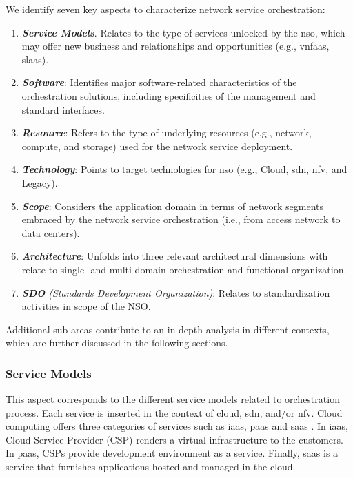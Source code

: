 We identify seven key aspects to characterize network service orchestration: 
\begin{enumerate}
\item \textit{\textbf{Service Models}}. Relates to the type of services unlocked by the \gls{nso}, which may offer new business and relationships and opportunities  (e.g., \gls{vnfaas}, \gls{slaas}).
\item \textbf{\textit{Software}}: Identifies major software-related characteristics of the orchestration solutions, including specificities of the  management and standard interfaces.
\item \textbf{\textit{Resource}}: Refers to the type of underlying resources (e.g., network, compute, and storage) used for the network service deployment.
\item \textbf{\textit{Technology}}: Points to target technologies for \gls{nso} (e.g., Cloud, \gls{sdn}, \gls{nfv}, and Legacy).
\item \textit{\textbf{Scope}}: Considers the application domain in terms of network segments embraced by the network service orchestration (i.e., from access network to data centers).  
\item \textbf{\textit{Architecture}}: Unfolds into three relevant architectural dimensions with relate to single- and multi-domain orchestration and functional  organization.
\item \textit{\textbf{SDO} (Standards Development Organization)}: Relates to standardization activities in scope of the NSO.
\end{enumerate}

Additional sub-areas contribute to an in-depth analysis in different contexts, which are  further  discussed in the following sections. 

\subsubsection{Service Models}
This aspect corresponds to the different service models related to orchestration process. Each service is inserted in the context of cloud, \gls{sdn}, and/or \gls{nfv}. Cloud computing offers three categories of services such as \gls{iaas}, \gls{paas} and \gls{saas} \cite{Leavitt2009}. In \gls{iaas}, Cloud Service Provider (CSP) renders a virtual infrastructure to the customers. In \gls{paas}, CSPs provide development environment as a service. Finally, \gls{saas} is a service that furnishes applications hosted and managed in the cloud. 

